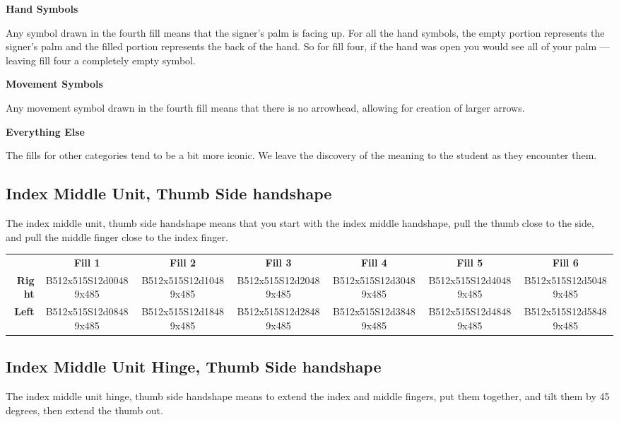 \documentclass{article}
\begin{document}
\noindent
\textbf{Hand Symbols}

Any symbol drawn in the fourth fill means that the signer's palm is facing up.
For all the hand symbols, the empty portion represents the signer's palm and the filled portion represents the back of the hand.
So for fill four, if the hand was open you would see all of your palm --- leaving fill four a completely empty symbol.

\noindent
\textbf{Movement Symbols}

Any movement symbol drawn in the fourth fill means that there is no arrowhead, allowing for creation of larger arrows.

\noindent
\textbf{Everything Else}

The fills for other categories tend to be a bit more iconic.
We leave the discovery of the meaning to the student as they encounter them.

\subsection{Index Middle Unit, Thumb Side handshape}

The index middle unit, thumb side handshape means that you start with the index middle handshape, pull the thumb close to the side, and pull the middle finger close to the index finger.

\begin{center}
\begin{tabular}{r*{6}{c}}
&\textbf{Fill 1}&\textbf{Fill 2}&\textbf{Fill 3}&\textbf{Fill 4}&\textbf{Fill 5}&\textbf{Fill 6}\\
\textbf{Right}&
B512x515S12d00489x485&
B512x515S12d10489x485&
B512x515S12d20489x485&
B512x515S12d30489x485&
B512x515S12d40489x485&
B512x515S12d50489x485\\
\textbf{Left}&
B512x515S12d08489x485&
B512x515S12d18489x485&
B512x515S12d28489x485&
B512x515S12d38489x485&
B512x515S12d48489x485&
B512x515S12d58489x485\\
\end{tabular}
\end{center}

\subsection{Index Middle Unit Hinge, Thumb Side handshape}

The index middle unit hinge, thumb side handshape means to extend the index and middle fingers, put them together, and tilt them by 45 degrees, then extend the thumb out.
\end{document}
